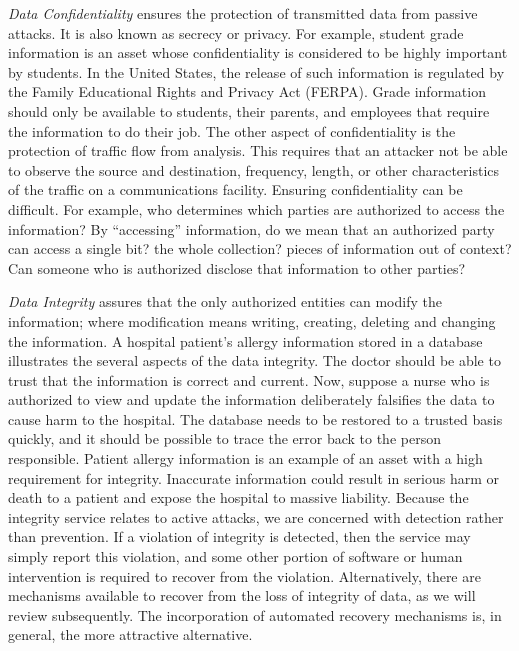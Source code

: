 	\textit{Data Confidentiality} ensures the protection of transmitted data from passive attacks.
	It is also known as secrecy or privacy.
	For example, student grade information is an asset whose confidentiality is considered to be highly important by students.
	In the United States, the release of such information is regulated by the Family Educational Rights and Privacy Act (FERPA).
	Grade information should only be available to students, their parents, and employees that require the information to do their job.
	The other aspect of confidentiality is the protection of traffic flow from analysis.
	This requires that an attacker not be able to observe the source and destination, frequency, length, or other characteristics of the traffic on a communications facility.
	Ensuring confidentiality can be difficult.
	For example, who determines which parties are authorized to access the information?
	By ``accessing'' information, do we mean that an authorized party can access a single bit? the whole collection? pieces of information out of context?
	Can someone who is authorized disclose that information to other parties?\cite{pfleeger2002security}

	\textit{Data Integrity} assures that the only authorized entities can modify the information; where modification means writing, creating, deleting and changing the information.
	A hospital patient's allergy information stored in a database illustrates the several aspects of the data integrity.
	The doctor should be able to trust that the information is correct and current.
	Now, suppose a nurse who is authorized to view and update the information deliberately falsifies the data to cause harm to the hospital.
	The database needs to be restored to a trusted basis quickly, and it should be possible to trace the error back to the person responsible.
	Patient allergy information is an example of an asset with a high requirement for integrity. 
	Inaccurate information could result in serious harm or death to a patient and expose the hospital to massive liability.
	Because the integrity service relates to active attacks, we are concerned with detection rather than prevention.
	If a violation of integrity is detected, then the service may simply report this violation, and some other portion of software or human intervention is required to recover from the violation.
	Alternatively, there are mechanisms available to recover from the loss of integrity of data, as we will review subsequently. The incorporation of automated recovery mechanisms is, in general, the more attractive alternative.


